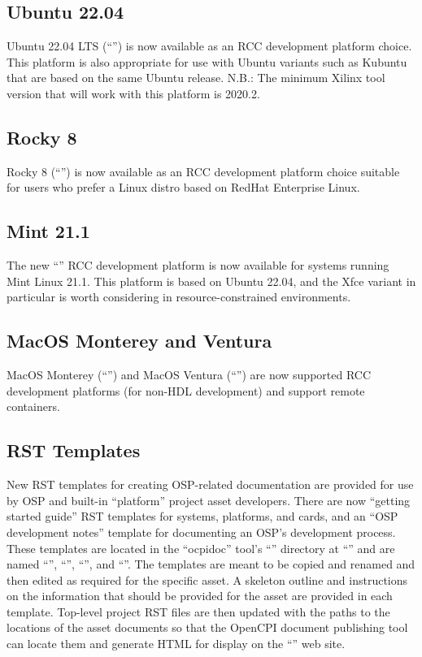 \subsection{Ubuntu 22.04}
\label{sec:25_ubuntu22}
Ubuntu 22.04 LTS (``'') is now available as an RCC development platform choice.  This platform is also appropriate for use with Ubuntu variants such as Kubuntu that are based on the same Ubuntu release.  N.B.: The minimum Xilinx tool version that will work with this platform is 2020.2.\\

\subsection{Rocky 8}
\label{sec:25_rocky8}
Rocky 8 (``'') is now available as an RCC development platform choice suitable for users who prefer a Linux distro based on RedHat Enterprise Linux.

\subsection{Mint 21.1}
\label{sec:25_mint}
The new ``'' RCC development platform is now available for systems running Mint Linux 21.1.  This platform is based on Ubuntu 22.04, and the Xfce variant in particular is worth considering in resource-constrained environments.\\

\subsection{MacOS Monterey and Ventura}
\label{sec:25_macos}
MacOS Monterey (``'') and MacOS Ventura (``'') are now supported RCC development platforms (for non-HDL development) and support remote containers.\\

\subsection{RST Templates}
\label{sec:25_rst}
New RST templates for creating OSP-related documentation are provided for use by OSP and built-in ``platform'' project asset developers. There are now ``getting started guide'' RST templates for systems, platforms, and cards, and an ``OSP development notes'' template for documenting an OSP's development process. These templates are located in the ``ocpidoc'' tool's ``'' directory at ``'' and are named ``'', ``'', ``'', and ``''.  The templates are meant to be copied and renamed and then edited as required for the specific asset.  A skeleton outline and instructions on the information that should be provided for the asset are provided in each template. Top-level project RST files are then updated with the paths to the locations of the asset documents so that the OpenCPI document publishing tool can locate them and generate HTML for display on the ``'' web site.\\

